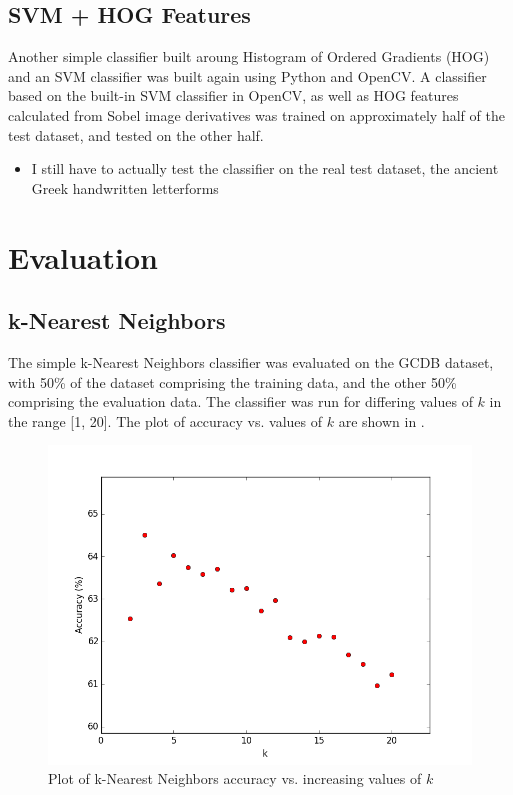 \documentclass[10pt,twocolumn,letterpaper]{article}
\begin{document}
\subsection{SVM + HOG Features}

Another simple classifier built aroung Histogram of Ordered Gradients (HOG) and an SVM classifier was built again using Python and OpenCV. A classifier based on the built-in SVM classifier in OpenCV, as well as HOG features calculated from Sobel image derivatives was trained on approximately half of the test dataset, and tested on the other half.
\begin{itemize}
    \item I still have to actually test the classifier on the real test dataset, the ancient Greek handwritten letterforms
\end{itemize}

\section{Evaluation}
\subsection{k-Nearest Neighbors}

The simple k-Nearest Neighbors classifier was evaluated on the GCDB dataset, with 50\% of the dataset comprising the training data, and the other 50\% comprising the evaluation data. The classifier was run for differing values of $k$ in the range [1, 20]. The plot of accuracy vs. values of $k$ are shown in \label{fig:kNNplot}.

\begin{figure}
    \begin{center}
        \includegraphics[width=0.8\linewidth]{res/figure_1.png}
        \caption{Plot of k-Nearest Neighbors accuracy vs. increasing values of $k$}
    \end{center}
    \label{fig:kNNplot}
\end{figure}
\end{document}
